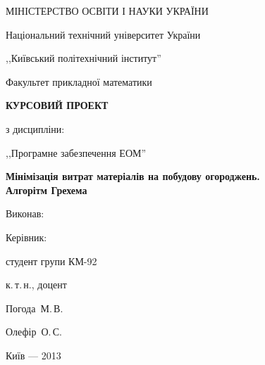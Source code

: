 \documentclass[simple,14pt,utf8,ukrainian]{eskdtext}
\begin{document}
\begin{titlepage}
    \begin{center}
        \MakeUppercase{Міністерство освіти і науки України}

        Національний технічний університет України

        ,,Київський політехнічний інститут''

        \vspace*{0.5cm}

        Факультет прикладної математики

        \vfill

        \textbf{\MakeUppercase{Курсовий проект}}

        з дисципліни:

        ,,Програмне забезпечення ЕОМ''

        \textbf{Мінімізація витрат матеріалів на побудову огороджень.\\
          Алгорітм Грехема}
    \end{center}

    \vfill

    \begin{minipage}{0.15\textwidth}
      Виконав:

      Керівник:
    \end{minipage}
    \begin{minipage}{0.3\textwidth}
      студент групи КМ-92

      к.\,т.\,н., доцент
    \end{minipage}
    \begin{minipage}{0.2\textwidth}
      Погода~М.\,В.

      Олефір~О.\,С.
    \end{minipage}
    \begin{minipage}{0.20\textwidth}
      \underline{\hspace{0.8\textwidth}}

      \underline{\hspace{0.8\textwidth}}
    \end{minipage}

    \vfill

    \vfill

    \begin{center}
        Київ --- 2013
    \end{center}
\end{titlepage}
\tableofcontents
\newpage
\end{document}
